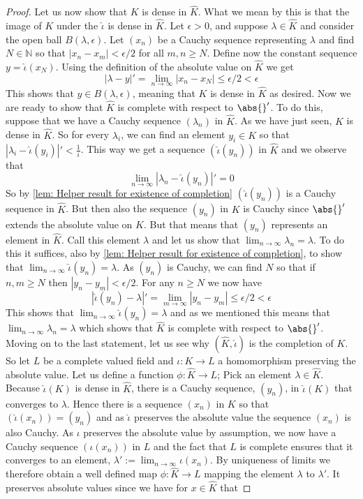 \documentclass{article}
\newcommand{\mbb}[1]{\mathbb{#1}}
\numberwithin{equation}{section}
\begin{document}
\begin{proof}
	Let us now show that $K$ is dense in $\hat K$. What we mean by this is that the image of $K$ under the $\hat \iota$ is dense in $\hat K$. Let $\epsilon > 0$, and suppose $\lambda \in \hat K$ and consider the open ball $B(\lambda, \epsilon)$. Let $(x_n)$ be a Cauchy sequence representing $\lambda$ and find $N \in \mbb N$ so that $|x_n - x_m| < \epsilon / 2$ for all $m,n \geq N$. Define now the constant sequence $y = \hat \iota (x_N)$. Using the definition of the absolute value on $\hat K$ we get
	$$|\lambda - y|' = \lim_{n \to \infty} |x_n - x_N| \leq \epsilon/2 < \epsilon$$
	This shows that $y \in B(\lambda, \epsilon)$, meaning that $K$ is dense in $\hat K$ as desired. Now we are ready to show that $\hat K$ is complete with respect to $\abs{}'$. To do this, suppose that we have a Cauchy sequence $(\lambda_n)$ in $\hat K$. As we have just seen, $K$ is dense in $\hat K$. So for every $\lambda_i$, we can find an element $y_i \in K$ so that $|\lambda_i - \hat \iota (y_i)|' < \frac{1}{i}$. This way we get a sequence $(\hat \iota (y_n))$ in $\hat K$ and we observe that
	$$\lim_{n \to \infty} |\lambda_n - \hat \iota(y_n)|' = 0$$
	So by \cref{lem: Helper result for existence of completion} $(\hat \iota (y_n))$ is a Cauchy sequence in $\hat K$. But then also the sequence $(y_n)$ in $K$ is Cauchy since $\abs{}'$ extends the absolute value on $K$. But that means that $(y_n)$ represents an element in $\hat K$. Call this element $\lambda$ and let us show that $\lim_{n \to \infty} \lambda_n = \lambda$. To do this it suffices, also by \cref{lem: Helper result for existence of completion}, to show that $\lim_{n \to \infty} \hat \iota (y_n) = \lambda$. As $(y_n)$ is Cauchy, we can find $N$ so that if $n,m \geq N$ then $|y_n - y_m| < \epsilon / 2$. For any $n \geq N$ we now have
	$$|\hat \iota (y_n) - \lambda|' = \lim_{m \to \infty} |y_n - y_m| \leq \epsilon / 2 < \epsilon$$
	This shows that $\lim_{n \to \infty} \hat \iota (y_n) = \lambda$ and as we mentioned this means that $\lim_{n \to \infty} \lambda_n = \lambda$
	which shows that $\hat K$ is complete with respect to $\abs{}'$. Moving on to the last statement, let us see why $(\hat K, \hat \iota)$ is the completion of $K$. So let $L$ be a complete valued field and $\iota : K \to L$ a homomorphism preserving the absolute value. Let us define a function $\phi : \hat K \to L$; Pick an element $\lambda \in \hat K$. Because $\hat \iota (K)$ is dense in $\hat K$, there is a Cauchy sequence, $(y_n)$, in $\hat \iota (K)$ that converges to $\lambda$. Hence there is a sequence $(x_n)$ in $K$ so that $(\hat \iota(x_n)) = (y_n)$ and as $\hat \iota$ preserves the absolute value the sequence $(x_n)$ is also Cauchy. As $\iota$ preserves the absolute value by assumption, we now have a Cauchy sequence $(\iota(x_n))$ in $L$ and the fact that $L$ is complete ensures that it converges to an element, $\lambda' := \lim_{n \to \infty} \iota(x_n)$. By uniqueness of limits we therefore obtain a well defined map $\phi : \hat K \to L$ mapping the element $\lambda$ to $\lambda'$. It preserves absolute values since we have for $x \in \hat K$ that

\end{proof}
\end{document}
